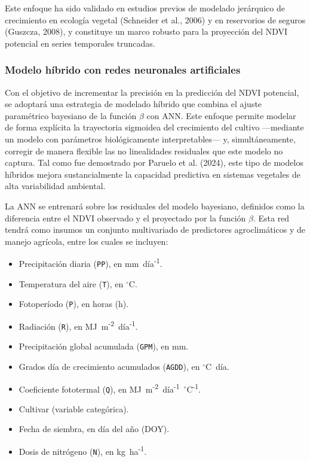 \documentclass[
11pt, %
]{charter}
\begin{document}
Este enfoque ha sido validado en estudios previos de modelado jerárquico de crecimiento en ecología vegetal (Schneider et al., 2006) y en reservorios de seguros (Guszcza, 2008), y constituye un marco robusto para la proyección del NDVI potencial en series temporales truncadas.


\subsubsection{Modelo híbrido con redes neuronales artificiales}
\label{sec:ANN-}

Con el objetivo de incrementar la precisión en la predicción del NDVI potencial, se adoptará una estrategia de modelado híbrido que combina el ajuste paramétrico bayesiano de la función $\beta$ con ANN. Este enfoque permite modelar de forma explícita la trayectoria sigmoidea del crecimiento del cultivo —mediante un modelo con parámetros biológicamente interpretables— y, simultáneamente, corregir de manera flexible las no linealidades residuales que este modelo no captura. Tal como fue demostrado por Paruelo et al. (2024), este tipo de modelos híbridos mejora sustancialmente la capacidad predictiva en sistemas vegetales de alta variabilidad ambiental.

La ANN se entrenará sobre los residuales del modelo bayesiano, definidos como la diferencia entre el NDVI observado y el proyectado por la función $\beta$. Esta red tendrá como insumos un conjunto multivariado de predictores agroclimáticos y de manejo agrícola, entre los cuales se incluyen:

\begin{itemize}
    \item Precipitación diaria (\texttt{PP}), en mm~día\textsuperscript{-1}.
    \item Temperatura del aire (\texttt{T}), en \(^\circ\)C.
    \item Fotoperíodo (\texttt{P}), en horas (h).
    \item Radiación (\texttt{R}), en MJ~m\textsuperscript{-2}~día\textsuperscript{-1}.
    \item Precipitación global acumulada (\texttt{GPM}), en mm.
    \item Grados día de crecimiento acumulados (\texttt{AGDD}), en \(^\circ\)C~día.
    \item Coeficiente fototermal (\texttt{Q}), en MJ~m\textsuperscript{-2}~día\textsuperscript{-1}~\(^\circ\)C\textsuperscript{-1}.
    \item Cultivar (variable categórica).
    \item Fecha de siembra, en día del año (DOY).
    \item Dosis de nitrógeno (\texttt{N}), en kg~ha\textsuperscript{-1}.
\end{itemize}
\end{document}
